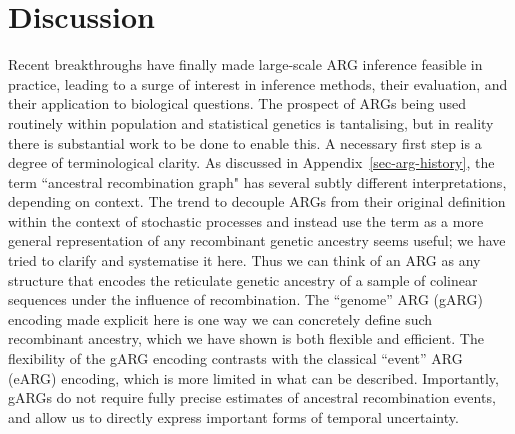 \documentclass{article}
\begin{document}
\section{Discussion}
\label{sec-discussion}
Recent breakthroughs have finally made large-scale ARG inference
feasible in practice, leading to a surge of interest
in inference methods, their evaluation, and their application to biological questions.
The prospect of ARGs being used routinely within population
and statistical genetics is tantalising,
but in reality there is substantial work to be done to
enable this.
A necessary first step is a degree of terminological clarity.
As discussed in Appendix~\ref{sec-arg-history}, the term
``ancestral recombination graph" has several
subtly different interpretations, depending on context.
The trend to decouple ARGs from their original definition
within the context of stochastic
processes and instead use the term as a more general representation of any
recombinant genetic ancestry seems useful; we have
tried to clarify and systematise it here. Thus
we can think of an ARG as any structure that encodes the
reticulate genetic ancestry of a sample of colinear sequences under
the influence of recombination. The ``genome'' ARG (gARG) encoding
made explicit here is one way we can concretely
define such recombinant ancestry, which we have shown is both
flexible and efficient.
The flexibility of the gARG encoding contrasts with the classical
``event'' ARG (eARG) encoding, which is more limited in what can be described.
Importantly, gARGs do not require fully precise estimates of
ancestral recombination events,
and allow us to directly express important forms of temporal uncertainty.
\end{document}
